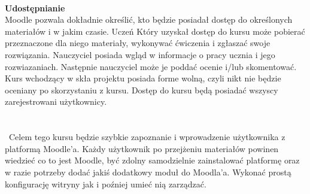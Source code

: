 \\
\textbf{Udostępnianie} \\
Moodle pozwala dokładnie określić, kto będzie posiadał dostęp do określonych materiałów i w jakim czasie. Uczeń Który uzyskał dostęp do kursu może pobierać przeznaczone dla niego materiały, wykonywać ćwiczenia i zgłaszać swoje rozwiązania. Nauczyciel posiada wgląd w informacje o pracy ucznia i jego rozwiazaniach. Następnie nauczyciel może je poddać ocenie i/lub skomentować. Kurs wchodzący w skła projektu posiada forme wolną, czyli nikt nie będzie oceniany po skorzystaniu z kursu. Dostęp do kursu będą posiadać wszyscy zarejestrowani użytkownicy.\\
\\
\\
\ Celem tego kursu będzie szybkie zapoznanie i wprowadzenie użytkownika z platformą Moodle'a. Każdy użytkownik po przejżeniu materiałów powinen wiedzieć co to jest Moodle, być zdolny samodzielnie zainstalować platformę oraz w razie potrzeby dodać jakiś dodatkowy moduł do Moodla'a. Wykonać prostą konfigurację witryny jak i poźniej umieć nią zarządzać.


